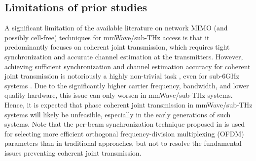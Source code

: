 \documentclass[10pt,journal,a4paper]{IEEEtran}
\begin{document}
\subsection{Limitations of prior studies}
A significant limitation of the available literature on network MIMO (and possibly cell-free) techniques for mmWave/sub-THz access is that it predominantly focuses on coherent joint transmission, which requires tight synchronization and accurate channel estimation at the transmitters. However, achieving sufficient synchronization and channel estimation accuracy for coherent joint transmission is notoriously a highly non-trivial task \cite{tuninetti2016coverage,fettweis2020network}, even for sub-6GHz systems \cite{irmer2011coordinated}. Due to the significantly higher carrier frequency, bandwidth, and lower quality hardware, this issue can only worsen in mmWave/sub-THz systems. Hence, it is expected that phase coherent joint transmission in mmWave/sub-THz systems will likely be unfeasible, especially in the early generations of such systems. Note that  the per-beam synchronization technique proposed in \cite{fettweis2020network} is used for selecting more efficient orthogonal frequency-division multiplexing (OFDM) parameters than in traditional approaches, but not to resolve the fundamental issues preventing coherent joint transmission. %
\end{document}
